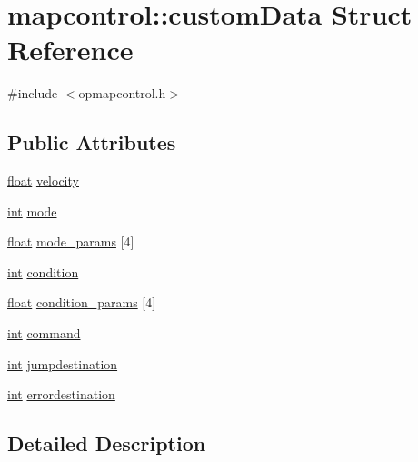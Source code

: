 \hypertarget{structmapcontrol_1_1custom_data}{\section{mapcontrol\-:\-:custom\-Data Struct Reference}
\label{structmapcontrol_1_1custom_data}
}


{\ttfamily \#include $<$opmapcontrol.\-h$>$}

\subsection*{Public Attributes}
\begin{DoxyCompactItemize}
\item 
\hyperlink{_super_l_u_support_8h_a6a1bb6ed41f44b60e7bd83b0e9945aa7}{float} \hyperlink{structmapcontrol_1_1custom_data_ab084fbb62527f0b71d74c9977c2e3f90}{velocity}
\item 
\hyperlink{ioapi_8h_a787fa3cf048117ba7123753c1e74fcd6}{int} \hyperlink{structmapcontrol_1_1custom_data_a9279c0043a43ebef696356bae0099891}{mode}
\item 
\hyperlink{_super_l_u_support_8h_a6a1bb6ed41f44b60e7bd83b0e9945aa7}{float} \hyperlink{structmapcontrol_1_1custom_data_ad6156981de3b51dd4942a6c4a53dbc8d}{mode\-\_\-params} \mbox{[}4\mbox{]}
\item 
\hyperlink{ioapi_8h_a787fa3cf048117ba7123753c1e74fcd6}{int} \hyperlink{structmapcontrol_1_1custom_data_a4bc59f4c1c8b0d292c6544d656ccd74a}{condition}
\item 
\hyperlink{_super_l_u_support_8h_a6a1bb6ed41f44b60e7bd83b0e9945aa7}{float} \hyperlink{structmapcontrol_1_1custom_data_a9b6c6f2c6385e568668e7d821fcb5da7}{condition\-\_\-params} \mbox{[}4\mbox{]}
\item 
\hyperlink{ioapi_8h_a787fa3cf048117ba7123753c1e74fcd6}{int} \hyperlink{structmapcontrol_1_1custom_data_a45873bfe2b453babcb46de68a336b514}{command}
\item 
\hyperlink{ioapi_8h_a787fa3cf048117ba7123753c1e74fcd6}{int} \hyperlink{structmapcontrol_1_1custom_data_a5e5179235bf8627c28c4c8b4ce0c8b84}{jumpdestination}
\item 
\hyperlink{ioapi_8h_a787fa3cf048117ba7123753c1e74fcd6}{int} \hyperlink{structmapcontrol_1_1custom_data_a065cac348b1f88fe39b41fd1d0f6fad4}{errordestination}
\end{DoxyCompactItemize}


\subsection{Detailed Description}



